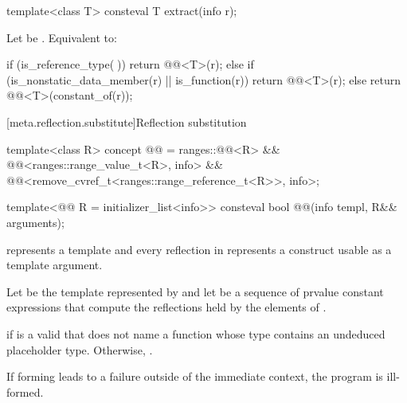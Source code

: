 %
\begin{itemdecl}
template<class T>
  consteval T extract(info r);
\end{itemdecl}

\begin{itemdescr}
\pnum
\effects
Let  be .
Equivalent to:
\begin{codeblock}
if (is_reference_type(^^T)) {
  return @@<T>(r);
} else if (is_nonstatic_data_member(r) || is_function(r)) {
  return @@<T>(r);
} else {
  return @@<T>(constant_of(r));
}
\end{codeblock}
\end{itemdescr}

[meta.reflection.substitute]{Reflection substitution}

\begin{itemdecl}
template<class R>
concept @@ =
  ranges::@@<R> &&
  @@<ranges::range_value_t<R>, info> &&
  @@<remove_cvref_t<ranges::range_reference_t<R>>, info>;

template<@@ R = initializer_list<info>>
consteval bool @@(info templ, R&& arguments);
\end{itemdecl}

\begin{itemdescr}
\pnum
\constantwhen
{} represents a template
and every reflection in  represents a construct
usable as a template argument.

\pnum
Let  be the template represented by 
and let  be a sequence of prvalue constant expressions
that compute the reflections held by the elements of .

\pnum
\returns
{} if  is a valid 
that does not name a function
whose type contains an undeduced placeholder type.
Otherwise, .

\pnum
\begin{note}
If forming  leads to a failure
outside of the immediate context,
the program is ill-formed.
\end{note}
\end{itemdescr}

